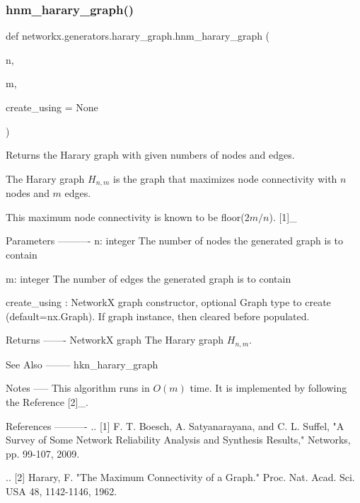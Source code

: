 \subsubsection{\texorpdfstring{hnm\+\_\+harary\+\_\+graph()}{hnm\_harary\_graph()}}
{\footnotesize\ttfamily def networkx.\+generators.\+harary\+\_\+graph.\+hnm\+\_\+harary\+\_\+graph (\begin{DoxyParamCaption}\item[{}]{n,  }\item[{}]{m,  }\item[{}]{create\+\_\+using = {\ttfamily None} }\end{DoxyParamCaption})}

\begin{DoxyVerb}Returns the Harary graph with given numbers of nodes and edges.

The Harary graph $H_{n,m}$ is the graph that maximizes node connectivity
with $n$ nodes and $m$ edges.

This maximum node connectivity is known to be floor($2m/n$). [1]_

Parameters
----------
n: integer
   The number of nodes the generated graph is to contain

m: integer
   The number of edges the generated graph is to contain

create_using : NetworkX graph constructor, optional Graph type
 to create (default=nx.Graph). If graph instance, then cleared
 before populated.

Returns
-------
NetworkX graph
    The Harary graph $H_{n,m}$.

See Also
--------
hkn_harary_graph

Notes
-----
This algorithm runs in $O(m)$ time.
It is implemented by following the Reference [2]_.

References
----------
.. [1] F. T. Boesch, A. Satyanarayana, and C. L. Suffel,
   "A Survey of Some Network Reliability Analysis and Synthesis Results,"
   Networks, pp. 99-107, 2009.

.. [2] Harary, F. "The Maximum Connectivity of a Graph."
   Proc. Nat. Acad. Sci. USA 48, 1142-1146, 1962.
\end{DoxyVerb}
 